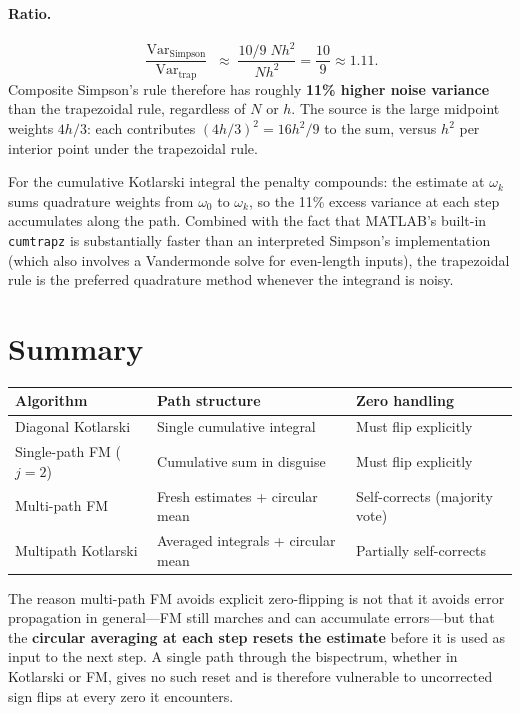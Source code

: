 \documentclass[11pt]{article}
\begin{document}
\paragraph{Ratio.}
\[
    \frac{\operatorname{Var}_{\mathrm{Simpson}}}{\operatorname{Var}_{\mathrm{trap}}}
    \;\approx\; \frac{10/9\;Nh^2}{Nh^2} = \frac{10}{9} \approx 1.11.
\]
Composite Simpson's rule therefore has roughly \textbf{11\% higher noise
variance} than the trapezoidal rule, regardless of $N$ or $h$.  The
source is the large midpoint weights $4h/3$: each contributes
$(4h/3)^2 = 16h^2/9$ to the sum, versus $h^2$ per interior point under
the trapezoidal rule.

For the cumulative Kotlarski integral the penalty compounds: the estimate
at $\omega_k$ sums quadrature weights from $\omega_0$ to $\omega_k$, so
the 11\% excess variance at each step accumulates along the path.
Combined with the fact that MATLAB's built-in \texttt{cumtrapz} is
substantially faster than an interpreted Simpson's implementation
(which also involves a Vandermonde solve for even-length inputs), the
trapezoidal rule is the preferred quadrature method whenever the
integrand is noisy.

\section{Summary}

\begin{center}
\begin{tabular}{lll}
\hline
\textbf{Algorithm} & \textbf{Path structure} & \textbf{Zero handling} \\
\hline
Diagonal Kotlarski & Single cumulative integral & Must flip explicitly \\
Single-path FM ($j{=}2$) & Cumulative sum in disguise & Must flip explicitly \\
Multi-path FM & Fresh estimates + circular mean & Self-corrects (majority vote) \\
Multipath Kotlarski & Averaged integrals + circular mean & Partially self-corrects \\
\hline
\end{tabular}
\end{center}

The reason multi-path FM avoids explicit zero-flipping is not that it
avoids error propagation in general---FM still marches and can accumulate
errors---but that the \textbf{circular averaging at each step resets the
estimate} before it is used as input to the next step.  A single path
through the bispectrum, whether in Kotlarski or FM, gives no such reset
and is therefore vulnerable to uncorrected sign flips at every zero it
encounters.
\end{document}
